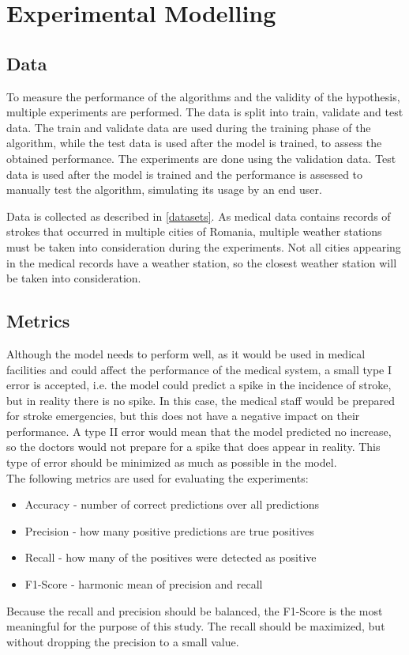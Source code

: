 \documentclass{article}
\begin{document}
\section{Experimental Modelling}

\subsection{Data}

To measure the performance of the algorithms and the validity of the hypothesis, multiple experiments are performed. The data is split into train, validate and test data. The train and validate data are used during the training phase of the algorithm, while the test data is used after the model is trained, to assess the obtained performance. The experiments are done using the validation data. Test data is used after the model is trained and the performance is assessed to manually test the algorithm, simulating its usage by an end user. 

Data is collected as described in \ref{datasets}. As medical data contains records of strokes that occurred in multiple cities of Romania, multiple weather stations must be 
taken into consideration during the experiments. Not all cities appearing in the medical records have a weather station, so the closest weather station will be taken into consideration. 


\subsection{Metrics} \label{metrics}

Although the model needs to perform well, as it would be used in medical facilities and could affect the performance of the medical system, a small type I error is accepted, i.e. the model could predict a spike in the incidence of stroke, but in reality there is no spike. In this case, the medical staff would be prepared for stroke emergencies, but this does not have a negative impact on their performance. A type II error would mean that the model predicted no increase, so the doctors would not prepare for a spike that does appear in reality. This type of error should be minimized as much as possible in the model.
\\

The following metrics are used for evaluating the experiments:
\begin{itemize}
    \item Accuracy - number of correct predictions over all predictions
    \item Precision - how many positive predictions are true positives
    \item Recall - how many of the positives were detected as positive
    \item F1-Score - harmonic mean of precision and recall
\end{itemize}
Because the recall and precision should be balanced, the F1-Score is the most meaningful for the purpose of this study. The recall should be maximized, but without dropping the precision to a small value.
\end{document}
